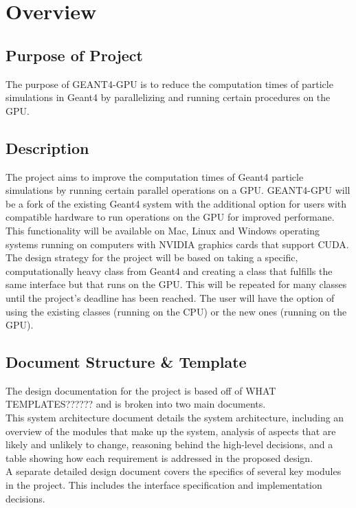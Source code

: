 \documentclass[12pt]{article}
\begin{document}
\section{Overview}
\subsection{Purpose of Project}
The purpose of GEANT4-GPU is to reduce the computation times of particle simulations in Geant4 by parallelizing and running certain procedures on the GPU.

\subsection{Description}
The project aims to improve the computation times of Geant4 particle simulations by running certain parallel operations on a GPU. GEANT4-GPU will be a fork of the existing Geant4 system with the additional option for users with compatible hardware to run operations on the GPU for improved performane. This functionality will be available on Mac, Linux and Windows operating systems running on computers with NVIDIA graphics cards that support CUDA.\\

The design strategy for the project will be based on taking a specific, computationally heavy class from Geant4 and creating a class that fulfills the same interface but that runs on the GPU. This will be repeated for many classes until the project's deadline has been reached. The user will have the option of using the existing classes (running on the CPU) or the new ones (running on the GPU).

\subsection{Document Structure \& Template}
The design documentation for the project is based off of WHAT TEMPLATES?????? and is broken into two main documents.\\

This system architecture document details the system architecture, including an overview of the modules that make up the system, analysis of aspects that are likely and unlikely to change, reasoning behind the high-level decisions, and a table showing how each requirement is addressed in the proposed design.\\

A separate detailed design document covers the specifics of several key modules in the project. This includes the interface specification and implementation decisions.
\end{document}
